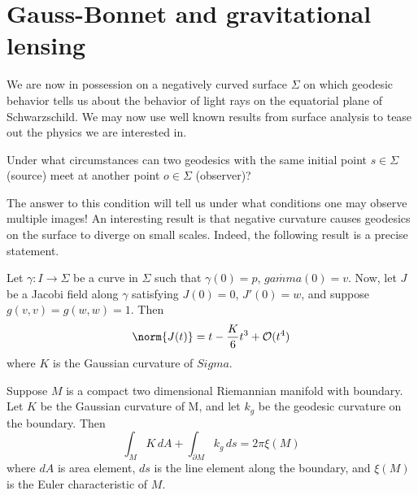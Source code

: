 \section{Gauss-Bonnet and gravitational lensing}
We are now in possession on a negatively curved surface $\Sigma$ on which geodesic behavior tells us about the behavior of light rays on the equatorial plane of Schwarzschild. We may now use well known results from surface analysis to tease out the physics we are interested in.
\begin{question}[]\label{}
Under what circumstances can two geodesics with the same initial point $s \in \Sigma$ (source) meet at another point $o \in \Sigma$ (observer)?
\end{question}
The answer to this condition will tell us under what conditions one may observe multiple images! An interesting result is that negative curvature causes geodesics on the surface to diverge on small scales. Indeed, the following result is a precise statement.
\begin{theorem}[]\label{}
Let $\gamma: I \to \Sigma$ be a curve in $\Sigma$ such that $\gamma(0)=p$, $\dot{gamma}(0) = v$. Now, let $J$ be a Jacobi field along $\gamma$ satisfying $J(0)=0$, $J'(0)=w$, and suppose $g(v,v)=g(w,w)=1$. Then
\begin{equation}\label{}
\norm{J(t)} = t - \frac{K}{6}t^3 + \order(t^4)
\end{equation}
where $K$ is the Gaussian curvature of $Sigma$.
\end{theorem}




\begin{theorem}[]\label{}
Suppose $M$ is a compact two dimensional Riemannian manifold with boundary. Let $K$ be the Gaussian curvature of M, and let $k_g$ be the geodesic curvature on the boundary. Then
\begin{equation}\label{}
\int_M K \, dA + \int_{\partial M} k_g \, ds = 2 \pi \xi(M)
\end{equation}
where $dA$ is area element, $ds$ is the line element along the boundary, and $\xi(M)$ is the Euler characteristic of $M$.
\end{theorem}
